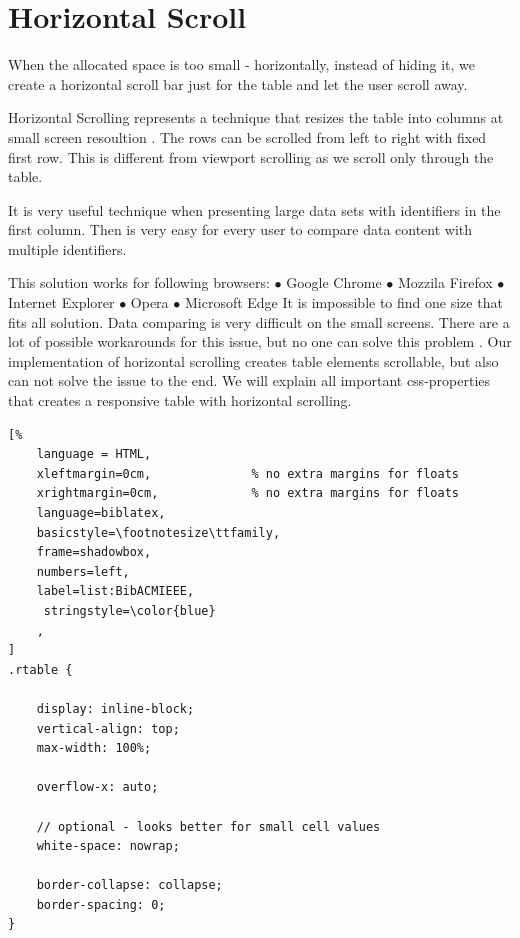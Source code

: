 \newpage
\section{Horizontal Scroll}
When the allocated space is too small - horizontally, instead of hiding it, we create a horizontal scroll bar just for the table and let the user scroll away. 
\newline 

Horizontal Scrolling represents a technique that resizes the table  
into columns at small screen resoultion \parencite{HS_1}. The rows can be scrolled from left to right with fixed first row.
This is different from viewport scrolling as we scroll only through the table.
\newline 

It is very useful technique when presenting large data
 sets with identifiers in the first column. Then is very easy for every user to compare data content with multiple identifiers\parencite{HS}.


This solution works for following browsers:
\newline $\bullet$ Google Chrome
\newline $\bullet$ Mozzila Firefox
\newline $\bullet$ Internet Explorer
\newline $\bullet$ Opera
\newline $\bullet$ Microsoft Edge
\newline
\newline It is impossible to find one size that fits all solution. Data comparing is very difficult on the small screens.
There are a lot of possible workarounds for this issue, but no one can solve this problem \parencite{HS_1}. 
Our implementation of horizontal scrolling creates table elements scrollable, but also can not solve the issue to the end\parencite{HS_1}.
We will explain all important css-properties that creates a responsive table with horizontal scrolling.

\begin{lstlisting}[%
    language = HTML, 
    xleftmargin=0cm,              % no extra margins for floats
    xrightmargin=0cm,             % no extra margins for floats
    language=biblatex,
    basicstyle=\footnotesize\ttfamily,
    frame=shadowbox,
    numbers=left,
    label=list:BibACMIEEE,
     stringstyle=\color{blue}
    ,
]
.rtable {

    display: inline-block;
    vertical-align: top;
    max-width: 100%;

    overflow-x: auto;

    // optional - looks better for small cell values
    white-space: nowrap;

    border-collapse: collapse;
    border-spacing: 0;
}

\end{lstlisting}

